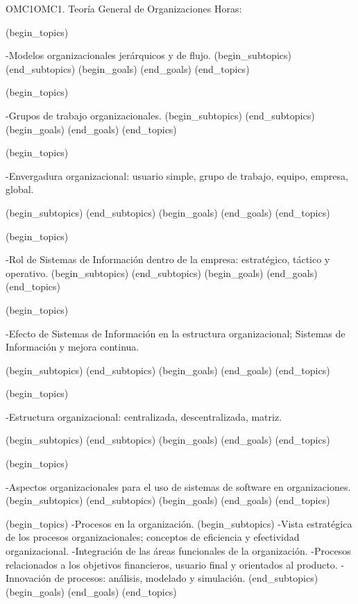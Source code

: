 \begin{BKL2}{OMC1}{OMC1. Teoría General de Organizaciones}
Horas:
 
(begin_topics)

-Modelos organizacionales jerárquicos y de flujo.
(begin_subtopics)
(end_subtopics)
(begin_goals)
(end_goals)
(end_topics)

 

(begin_topics)

-Grupos de trabajo organizacionales.
(begin_subtopics)
(end_subtopics)
(begin_goals)
(end_goals)
(end_topics)

 

(begin_topics)

-Envergadura organizacional: usuario simple, grupo de trabajo, equipo, empresa, global.

(begin_subtopics)
(end_subtopics)
(begin_goals)
(end_goals)
(end_topics)

 

(begin_topics)

-Rol de Sistemas de Información dentro de la empresa: estratégico, táctico y operativo.
(begin_subtopics)
(end_subtopics)
(begin_goals)
(end_goals)
(end_topics)

 

(begin_topics)

-Efecto de Sistemas de Información en la estructura organizacional; Sistemas de Información y mejora continua.

(begin_subtopics)
(end_subtopics)
(begin_goals)
(end_goals)
(end_topics)

 

(begin_topics)

-Estructura organizacional: centralizada, descentralizada, matriz.

(begin_subtopics)
(end_subtopics)
(begin_goals)
(end_goals)
(end_topics)

 

(begin_topics)

-Aspectos organizacionales para el uso de sistemas de software en organizaciones.
(begin_subtopics)
(end_subtopics)
(begin_goals)
(end_goals)
(end_topics)

(begin_topics)
-Procesos en la organización.
(begin_subtopics)
-Vista estratégica de los procesos organizacionales; conceptos de eficiencia y efectividad organizacional.
-Integración de las áreas funcionales de la organización.
-Procesos relacionados a los objetivos financieros, usuario final y orientados al producto.
-Innovación de procesos: análisis, modelado y simulación. 
(end_subtopics)
(begin_goals)
(end_goals)
(end_topics)


\end{BKL2}

